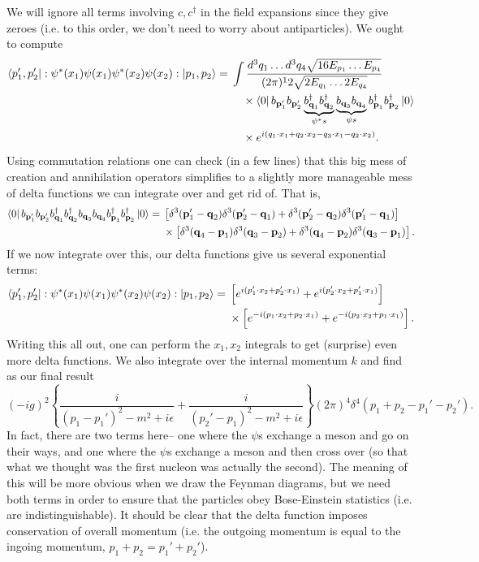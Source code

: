 We will ignore all terms involving $c,c^\dagger$ in the field expansions since they give zeroes (i.e. to this order, we don't need to worry about antiparticles). We ought to compute
\begin{align*}
    \left< p_1',p_2' \right|:\psi^*(x_1)\psi(x_1)\psi^*(x_2)\psi(x_2):\left| p_1,p_2 \right>={}&\int \frac{d^3 q_1 \ldots d^3 q_4 \sqrt{16 E_{p_1}\ldots E_{p_4}}}{(2\pi)^12 \sqrt{2E_{q_1}\ldots 2E_{q_4}}}\\ 
    &\quad {}\times\left< 0 \right|b_{\boldsymbol{\mathbf{p}}_1'} b_{\boldsymbol{\mathbf{p}}_2'} \underbrace{b_{\boldsymbol{\mathbf{q}}_1}^\dagger b_{\boldsymbol{\mathbf{q}}_2}^\dagger}_{\psi^*s} \underbrace{b_{\boldsymbol{\mathbf{q}}_3} b_{\boldsymbol{\mathbf{q}}_4}}_{\psi s} b_{\boldsymbol{\mathbf{p}}_1}^\dagger b_{\boldsymbol{\mathbf{p}}_2}^\dagger \left| 0 \right>\\
    &\quad {}\times e^{i(q_1\cdot x_1 +q_2 \cdot x_2-q_3 \cdot x_1 -q_2 \cdot x_2)}.
\end{align*}
Using commutation relations one can check (in a few lines) that this big mess of creation and annihilation operators simplifies to a slightly more manageable mess of delta functions we can integrate over and get rid of. That is,
\begin{align*}
    \left< 0 \right|b_{\boldsymbol{\mathbf{p}}_1'} b_{\boldsymbol{\mathbf{p}}_2'} {b_{\boldsymbol{\mathbf{q}}_1}^\dagger b_{\boldsymbol{\mathbf{q}}_2}^\dagger} {b_{\boldsymbol{\mathbf{q}}_3} b_{\boldsymbol{\mathbf{q}}_4}} b_{\boldsymbol{\mathbf{p}}_1}^\dagger b_{\boldsymbol{\mathbf{p}}_2}^\dagger \left| 0 \right>={}&
        \left[ \delta^3(\boldsymbol{\mathbf{p}}_1'-\boldsymbol{\mathbf{q}}_2)\delta^3(\boldsymbol{\mathbf{p}}_2'-\boldsymbol{\mathbf{q}}_1)+\delta^3(\boldsymbol{\mathbf{p}}_2'-\boldsymbol{\mathbf{q}}_2)\delta^3 (\boldsymbol{\mathbf{p}}_1' - \boldsymbol{\mathbf{q}}_1)\right]\\
    &\times \left[\delta^3 (\boldsymbol{\mathbf{q}}_4-\boldsymbol{\mathbf{p}}_1)\delta^3 (\boldsymbol{\mathbf{q}}_3-\boldsymbol{\mathbf{p}}_2)+\delta^3(\boldsymbol{\mathbf{q}}_4-\boldsymbol{\mathbf{p}}_2)\delta^3(\boldsymbol{\mathbf{q}}_3 - \boldsymbol{\mathbf{p}}_1)\right].
\end{align*}
If we now integrate over this, our delta functions give us several exponential terms:
\begin{align*}
    \left< p_1', p_2' \right|:\psi^*(x_1)\psi(x_1)\psi^*(x_2)\psi(x_2):\left| p_1,p_2 \right>={}&\left[e^{i(p_1'\cdot x_2 +p_2' \cdot x_1)}+e^{i(p_2'\cdot x_2 + p_1'\cdot x_1)}\right]\\
    &\times\left[e^{-i(p_1\cdot x_2 +p_2 \cdot x_1)}+e^{-i(p_2\cdot x_2 + p_1\cdot x_1)}\right].
\end{align*}
Writing this all out, one can perform the $x_1,x_2$ integrals to get (surprise) even more delta functions. We also integrate over the internal momentum $k$ and find as our final result
$$(-ig)^2 \left\{\frac{i}{(p_1-p_1')^2-m^2+i\epsilon}+\frac{i}{(p_2'-p_1)^2-m^2+i\epsilon}\right\} (2\pi)^4\delta^4(p_1+p_2-p_1'-p_2').$$
In fact, there are two terms here-- one where the $\psi$s exchange a meson and go on their ways, and one where the $\psi$s exchange a meson and then cross over (so that what we thought was the first nucleon was actually the second). The meaning of this will be more obvious when we draw the Feynman diagrams, but we need both terms in order to ensure that the particles obey Bose-Einstein statistics (i.e. are indistinguishable). It should be clear that the delta function imposes conservation of overall momentum (i.e. the outgoing momentum is equal to the ingoing momentum, $p_1+p_2=p_1'+p_2'$).

